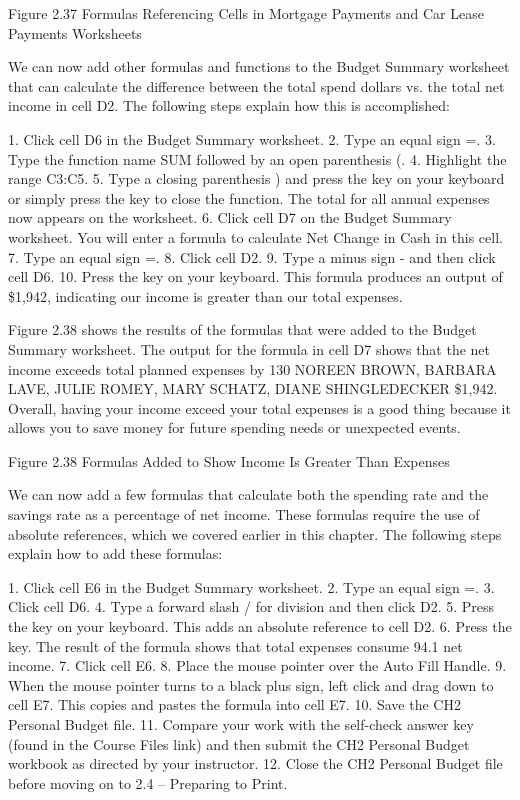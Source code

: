 Figure 2.37 Formulas Referencing Cells in Mortgage Payments and Car Lease Payments Worksheets


We can now add other formulas and functions to the Budget Summary worksheet that can calculate
the difference between the total spend dollars vs. the total net income in cell D2. The following steps
explain how this is accomplished:

1.   Click cell D6 in the Budget Summary worksheet.
2.   Type an equal sign =.
3.   Type the function name SUM followed by an open parenthesis (.
4.   Highlight the range C3:C5.
5.   Type a closing parenthesis ) and press the  key on your keyboard or simply press the  key to close the function. The total for all annual expenses now appears on the worksheet.
6.   Click cell D7 on the Budget Summary worksheet. You will enter a formula to calculate Net
Change in Cash in this cell.
7.   Type an equal sign =.
8.   Click cell D2.
9.   Type a minus sign - and then click cell D6.
10.   Press the  key on your keyboard. This formula produces an output of \$1,942, indicating
our income is greater than our total expenses.

Figure 2.38 shows the results of the formulas that were added to the Budget Summary worksheet.
The output for the formula in cell D7 shows that the net income exceeds total planned expenses by
130 NOREEN BROWN, BARBARA LAVE, JULIE ROMEY, MARY SCHATZ, DIANE SHINGLEDECKER
\$1,942. Overall, having your income exceed your total expenses is a good thing because it allows you
to save money for future spending needs or unexpected events.




Figure 2.38 Formulas Added to Show Income Is Greater Than Expenses


We can now add a few formulas that calculate both the spending rate and the savings rate as a
percentage of net income. These formulas require the use of absolute references, which we covered
earlier in this chapter. The following steps explain how to add these formulas:

1.   Click cell E6 in the Budget Summary worksheet.
2.   Type an equal sign =.
3.   Click cell D6.
4.   Type a forward slash / for division and then click D2.
5.   Press the  key on your keyboard. This adds an absolute reference to cell D2.
6.   Press the  key. The result of the formula shows that total expenses consume 94.1%
net income.
7.   Click cell E6.
8.   Place the mouse pointer over the Auto Fill Handle.
9.   When the mouse pointer turns to a black plus sign, left click and drag down to cell E7. This
copies and pastes the formula into cell E7.
10.   Save the CH2 Personal Budget file.
11.   Compare your work with the self-check answer key (found in the Course Files link) and then
submit the CH2 Personal Budget workbook as directed by your instructor.
12.   Close the CH2 Personal Budget file before moving on to 2.4 – Preparing to Print.

